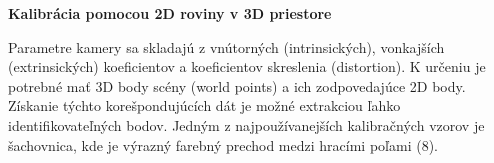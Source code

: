 \textbf{Kalibrácia pomocou 2D roviny v 3D priestore}




Parametre kamery sa skladajú z vnútorných (intrinsických), vonkajších (extrinsických) koeficientov a koeficientov skreslenia (distortion). K určeniu je potrebné mať 3D body scény (world points) a ich zodpovedajúce 2D body. Získanie týchto korešpondujúcích dát je možné extrakciou ľahko identifikovateľných bodov. Jedným z najpoužívanejších kalibračných vzorov je šachovnica, kde je výrazný farebný prechod medzi hracími poľami (8).



%
%
